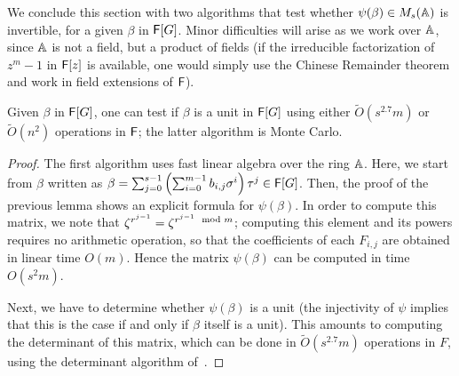 We conclude this section with two algorithms that test whether
$\psi(\beta) \in M_s(\mathbb{A})$ is invertible, for a given $\beta$ in
${\mathsf{F}}[G]$. Minor difficulties will arise as we work over $\mathbb{A}$, since
$\mathbb{A}$ is not a field, but a product of fields (if the irreducible
factorization of $z^m-1$ in ${\mathsf{F}}[z]$ is available, one would simply use
the Chinese Remainder theorem and work in field extensions of ${\mathsf{F}}$).

\begin{corollary}
  Given $\beta$ in ${\mathsf{F}}[G]$, one can test if $\beta$ is a unit in
  ${\mathsf{F}}[G]$ using either $\tilde{O}(s^{2.7} m)$ or $\tilde{O}(n^2)$
  operations in ${\mathsf{F}}$; the latter algorithm is Monte Carlo.
\end{corollary}
\begin{proof}
  The first algorithm uses fast linear algebra over the ring
  $\mathbb{A}$. Here, we start from $\beta$ written as $\beta = \sum_{j =
    0}^{s-1} \left( \sum_{i = 0}^{m-1} b_{i,j} \sigma^i \right) \tau^j
  \in {\mathsf{F}}[G]$. Then, the proof of the previous lemma shows an explicit
  formula for $\psi(\beta)$. In order to compute this matrix, we note
  that $\zeta^{r^{j-1}} = \zeta^{r^{j-1} \mod m}$; computing this
  element and its powers requires no arithmetic operation, so that the
  coefficients of each $F_{i,j}$ are obtained in linear time $O(m)$.
  Hence the matrix $\psi(\beta)$ can be computed in time $O(s^2m)$.

  Next, we have to determine whether $\psi(\beta)$ is a unit (the
  injectivity of $\psi$ implies that this is the case if and only if
  $\beta$ itself is a unit). This amounts to computing the determinant
  of this matrix, which can be done in $\tilde{O}(s^{2.7} m)$
  operations in $F$, using the determinant algorithm
  of~\cite[Section~6]{KaVi04}.
\end{proof}




